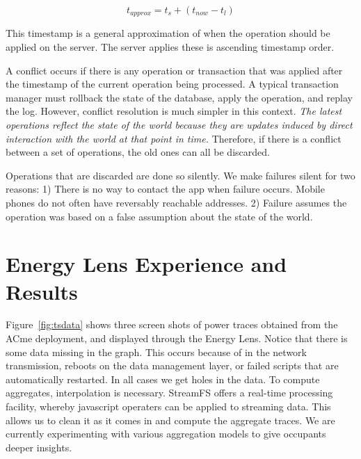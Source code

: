 \begin{equation}
t_{approx} = t_s + (t_{now} - t_l)
\end{equation}

This timestamp is a general approximation of when the operation should be applied on the server.  The server applies 
these is ascending timestamp order.

A conflict occurs if there is any operation or transaction that was applied after the timestamp of the current operation
being processed.  A typical transaction manager must rollback the state of the database, apply the operation, and replay
the log.  However, conflict resolution is much simpler in this context.  \emph{The latest operations reflect the state of the
world because they are updates induced by direct interaction with the world at that point in time.}  Therefore, if there is a conflict
between a set of operations, the old ones can all be discarded.

Operations that are discarded are done so silently.  We make failures silent for two reasons: 1) There is no way to contact the app when 
failure occurs.  Mobile phones
do not often have reversably reachable addresses.  2) Failure assumes the operation was based on a false assumption about the state
of the world.  


\section{Energy Lens Experience and Results}

Figure~\ref{fig:tsdata} shows three screen shots of power traces obtained from the ACme deployment, and displayed
through the Energy Lens.  Notice that there is
some data missing in the graph.  This occurs because of in the network transmission, reboots on the data management layer,
or failed scripts that are automatically restarted.  In all cases we get holes in the data.  To compute aggregates, interpolation 
is necessary.  StreamFS offers a real-time processing facility, whereby javascript operaters can be applied
to streaming data.  This allows us to clean it as it comes in and compute the aggregate traces.  We are currently experimenting
with various aggregation models to give occupants deeper insights.  



